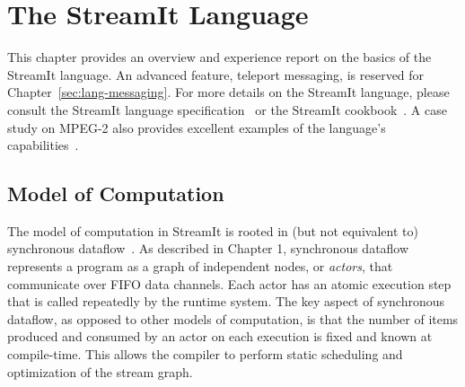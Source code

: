 \chapter{The StreamIt Language}
\label{chap:language}

This chapter provides an overview and experience report on the basics
of the StreamIt language.  An advanced feature, teleport messaging, is
reserved for Chapter~\ref{sec:lang-messaging}.  For more details on
the StreamIt language, please consult the StreamIt language
specification~\cite{streamit-lang-spec} or the StreamIt
cookbook~\cite{streamit-cookbook}.  A case study on MPEG-2 also
provides excellent examples of the language's
capabilities~\cite{drake-ipdps06}.

\section{Model of Computation}

The model of computation in StreamIt is rooted in (but not equivalent
to) synchronous dataflow~\cite{lee_static_1987}.  As described in
Chapter 1, synchronous dataflow represents a program as a graph of
independent nodes, or {\it actors}, that communicate over FIFO data
channels.  Each actor has an atomic execution step that is called
repeatedly by the runtime system.  The key aspect of synchronous
dataflow, as opposed to other models of computation, is that the
number of items produced and consumed by an actor on each execution is
fixed and known at compile-time.  This allows the compiler to perform
static scheduling and optimization of the stream graph.

